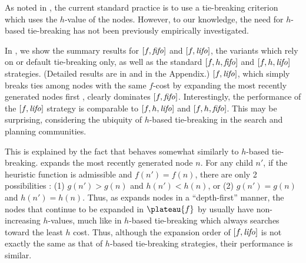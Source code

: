 \label{sec:noh}
As noted in , the current standard practice is to use a tie-breaking criterion which uses the $h$-value of the nodes. However, to our knowledge, the need for $h$-based tie-breaking has not been previously empirically investigated.

In , we show the summary results for $[f, {\text{\textit{fifo}}}]$ and $[f, {\text{\textit{lifo}}}]$, the
\astar variants which rely on \fifo or \lifo default tie-breaking only, as well as the standard $[f, h, {\text{\textit{fifo}}}]$ and $[f, h, {\text{\textit{lifo}}}]$ strategies.
(Detailed results are in
 and  in the Appendix.)
$[f,{\text{\textit{lifo}}}]$, which simply breaks ties among nodes with the same
$f$-cost by expanding the most recently generated nodes first
\cite{korf1985depth}, clearly dominates $[f,{\text{\textit{fifo}}}]$.  Interestingly,
the performance of the $[f,{\text{\textit{lifo}}}]$ strategy is comparable to
$[f,h,{\text{\textit{lifo}}}]$ and $[f,h,{\text{\textit{fifo}}}]$.  This may be surprising, considering
the ubiquity of $h$-based tie-breaking in the search and planning
communities.

This is explained by the fact that 
\lifo behaves somewhat similarly to $h$-based tie-breaking.
\lifo expands the most recently generated node $n$.
For any child $n'$, 
if the heuristic function is admissible and $f(n') = f(n)$, there are only 2 possibilities :
(1) $g(n') > g(n)$ and $h(n') < h(n)$, or
(2) $g(n') = g(n)$ and $h(n') = h(n)$.
Thus, as \lifo expands nodes in a ``depth-first'' manner,
the nodes that continue to be expanded in $\plateau{f}$ by \lifo usually   %
have non-increasing $h$-values,
much like in $h$-based tie-breaking which always searches toward the least $h$ cost.
Thus, although the expansion order of $[f,{\text{\textit{lifo}}}]$ is not exactly the same as that of $h$-based tie-breaking strategies,
their performance is similar.



